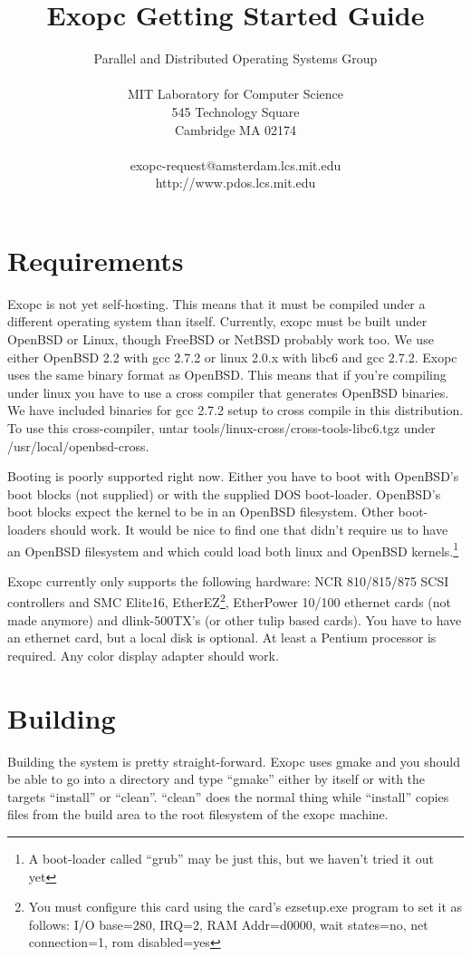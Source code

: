 \documentclass[11pt]{article}
\title{Exopc Getting Started Guide}
\author{
Parallel and Distributed Operating Systems Group\\
\\
MIT Laboratory for Computer Science \\
545 Technology Square \\
Cambridge MA 02174 \\
\\
exopc-request@amsterdam.lcs.mit.edu\\
http://www.pdos.lcs.mit.edu
}
\begin{document}
\maketitle

\section{Requirements}

Exopc is not yet self-hosting. This means that it must be compiled
under a different operating system than itself. Currently, exopc must
be built under OpenBSD or Linux, though FreeBSD or NetBSD probably
work too. We use either OpenBSD 2.2 with gcc 2.7.2 or linux 2.0.x with
libc6 and gcc 2.7.2. Exopc uses the same binary format as
OpenBSD. This means that if you're compiling under linux you have to
use a cross compiler that generates OpenBSD binaries. We have included
binaries for gcc 2.7.2 setup to cross compile in this distribution. To
use this cross-compiler, untar tools/linux-cross/cross-tools-libc6.tgz
under /usr/local/openbsd-cross.

Booting is poorly supported right now. Either you have to boot with
OpenBSD's boot blocks (not supplied) or with the supplied DOS
boot-loader. OpenBSD's boot blocks expect the kernel to be in an
OpenBSD filesystem. Other boot-loaders should work. It would be nice
to find one that didn't require us to have an OpenBSD filesystem and
which could load both linux and OpenBSD kernels.\footnote{A
boot-loader called ``grub'' may be just this, but we haven't tried it
out yet}

Exopc currently only supports the following hardware: NCR 810/815/875
SCSI controllers and SMC Elite16, EtherEZ\footnote{You must configure
this card using the card's ezsetup.exe program to set it as follows:
I/O base=280, IRQ=2, RAM Addr=d0000, wait states=no, net connection=1,
rom disabled=yes}, EtherPower 10/100 ethernet cards (not made anymore)
and dlink-500TX's (or other tulip based cards). You have to have an
ethernet card, but a local disk is optional. At least a Pentium
processor is required. Any color display adapter should work.

\section{Building}

Building the system is pretty straight-forward. Exopc uses gmake and you
should be able to go into a directory and type ``gmake'' either by
itself or with the targets ``install'' or ``clean''. ``clean'' does
the normal thing while ``install'' copies files from the build area to
the root filesystem of the exopc machine. 
\end{document}

